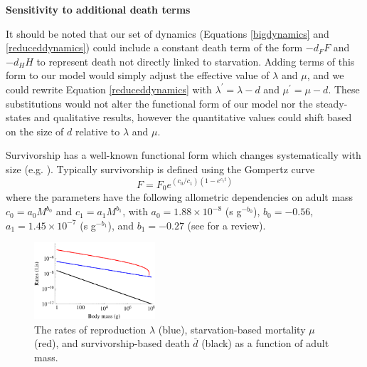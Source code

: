 \documentclass[twocolumn,preprintnumbers,amsmath,amssymb,superscriptaddress]{revtex4}
\begin{document}
{\bf Sensitivity to additional death terms}

It should be noted that our set of dynamics (Equations \ref{bigdynamics} and \ref{reduceddynamics}) could include a constant death term of the form $-d_{F}F$ and $-d_{H}H$ to represent death not directly linked to starvation. Adding terms of this form to our model would simply adjust the effective value of $\lambda$ and $\mu$, and we could rewrite Equation \ref{reduceddynamics} with $\lambda^{\prime}=\lambda-d$ and $\mu^{\prime}=\mu-d$. These substitutions would not alter the functional form of our model nor the steady-states and qualitative results, however the quantitative values could shift based on the size of $d$ relative to $\lambda$ and $\mu$. 

Survivorship has a well-known functional form which changes systematically with size (e.g. \cite{calder1984}). Typically survivorship is defined using the Gompertz curve 
\begin{equation}
F=F_{0}e^{\left(c_{0}/c_{1}\right)\left(1-e^{c_{1}t}\right)}
\label{gompertz}
\end{equation}
where the parameters have the following allometric dependencies on adult mass $c_{0}=a_{0}M^{b_{0}}$ and $c_{1}=a_{1}M^{b_{1}}$, with $a_{0}=1.88\times10^{-8}$ (s g$^{-b_{0}}$), $b_{0}=-0.56$, $a_{1}=1.45\times10^{-7}$ (s g$^{-b_{1}}$), and $b_{1}=-0.27$ (see \cite{calder1984} for a review).

\begin{figure}
\centering
\includegraphics[width=0.4\textwidth]{mortality-rate-comparison.eps}
\caption{\small{The rates of reproduction $\lambda$ (blue), starvation-based mortality $\mu$ (red), and survivorship-based death $\bar{d}$ (black) as a function of adult mass.}\label{fig:ratescomp}}
\end{figure}
\end{document}
